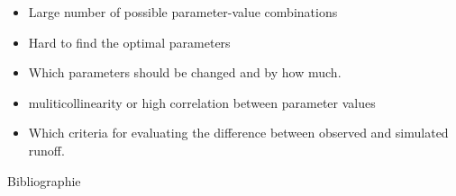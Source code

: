 \documentclass[aspectratio=169,professionalfonts, 12pt, t]{beamer}
\begin{document}
	\begin{frame}
	\titlepage
	\end{frame}

\begin{frame}
	

\tableofcontents
\end{frame}

	
	
	
	


\begin{frame}
\begin{itemize}[<+->]
	\transdissolve
	\item Large number of possible parameter-value combinations
	\item Hard to find the optimal parameters
	\item Which parameters should be changed and by how much. 
	\item muliticollinearity or high correlation between parameter values
	\item Which criteria for evaluating the difference between observed and 
	simulated runoff.
\end{itemize}
{\tiny }\end{frame}
 
\begin{frame}{Bibliographie}
	
	
\end{frame}
% 
\end{document}
